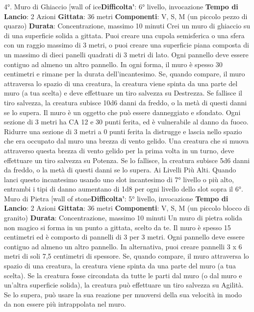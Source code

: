 \begin{multicols}{2}
4°.
Muro di Ghiaccio
[wall of ice\textbf{Difficolta'}:
6° livello, invocazione
\textbf{Tempo di Lancio}: 2 Azioni
\textbf{Gittata}: 36 metri
\textbf{Componenti}: V, S, M (un piccolo pezzo di quarzo)
\textbf{Durata}: Concentrazione, massimo 10 minuti
Crei un muro di ghiaccio su di una superficie solida a
gittata. Puoi creare una cupola semisferica o una sfera
con un raggio massimo di 3 metri, o puoi creare una
superficie piana composta di un massimo di dieci
panelli quadrati di 3 metri di lato. Ogni pannello deve
essere contiguo ad almeno un altro pannello. In ogni
forma, il muro è spesso 30 centimetri e rimane per la
durata dell’incantesimo.
Se, quando compare, il muro attraversa lo spazio di una
creatura, la creatura viene spinta da una parte del muro
(a tua scelta) e deve effettuare un tiro salvezza su
Destrezza. Se fallisce il tiro salvezza, la creatura
subisce 10d6 danni da freddo, o la metà di questi danni
se lo supera.
Il muro è un oggetto che può essere danneggiato e
sfondato. Ogni sezione di 3 metri ha CA 12 e 30 punti
ferita, ed è vulnerabile al danno da fuoco. Ridurre una
sezione di 3 metri a 0 punti ferita la distrugge e lascia
nello spazio che era occupato dal muro una brezza di
vento gelido. Una creatura che si muova attraverso
questa brezza di vento gelido per la prima volta in un
turno, deve effettuare un tiro salvezza su Potenza.
Se lo fallisce, la creatura subisce 5d6 danni da freddo,
o la metà di questi danni se lo supera.
Ai Livelli Più Alti. Quando lanci questo incantesimo
usando uno slot incantesimo di 7° livello o più alto,
entrambi i tipi di danno aumentano di 1d8 per ogni
livello dello slot sopra il 6°.
Muro di Pietra
[wall of stone\textbf{Difficolta'}:
5° livello, invocazione
\textbf{Tempo di Lancio}: 2 Azioni
\textbf{Gittata}: 36 metri
\textbf{Componenti}: V, S, M (un piccolo blocco di granito)
\textbf{Durata}: Concentrazione, massimo 10 minuti
Un muro di pietra solida non magico si forma in un
punto a gittata, scelto da te. Il muro è spesso 15
centimetri ed è composto di pannelli di 3 per 3 metri.
Ogni pannello deve essere contiguo ad almeno un altro
pannello. In alternativa, puoi creare pannelli 3 x 6 metri
di soli 7,5 centimetri di spessore.
Se, quando compare, il muro attraversa lo spazio di una
creatura, la creatura viene spinta da una parte del muro
(a tua scelta). Se la creatura fosse circondata da tutte le
parti dal muro (o dal muro e un’altra superficie solida),
la creatura può effettuare un tiro salvezza su Agilità.
Se lo supera, può usare la sua reazione per muoversi
della sua velocità in modo da non essere più
intrappolata nel muro.

\end{multicols}
